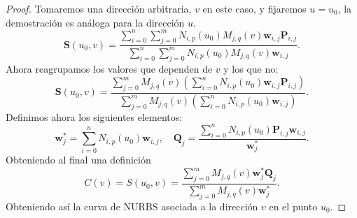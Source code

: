 \documentclass[11pt]{book}
\theoremstyle{plain} %
\theoremstyle{definition} %
\theoremstyle{definition} %
\begin{document}
\begin{proof}
    Tomaremos una dirección arbitraria, $v$ en este caso, y fijaremos $u=u_0$, la demostración es análoga para la dirección $u$.
        \begin{equation*}
            \mathbf{S}(u_0, v) = \frac{\sum_{i=0}^{n} \sum_{j=0}^{m} N_{i,p}(u_0) M_{j,q}(v) \mathbf{w}_{i,j} \mathbf{P}_{i,j}}{\sum_{i=0}^{n} \sum_{j=0}^{m} N_{i,p}(u_0) M_{j,q}(v) \mathbf{w}_{i,j}}.
        \end{equation*}
        Ahora reagrupamos los valores que dependen de $v$ y los que no:
        \begin{equation*}
            \mathbf{S}(u_0, v) = \frac{\sum_{j=0}^{m} M_{j,q}(v) \left( \sum_{i=0}^{n} N_{i,p}(u_0) \mathbf{w}_{i,j} \mathbf{P}_{i,j} \right)}{\sum_{j=0}^{m} M_{j,q}(v) \left( \sum_{i=0}^{n} N_{i,p}(u_0) \mathbf{w}_{i,j} \right)}.
        \end{equation*}
        Definimos ahora los siguientes elementos:
        \begin{equation*}
            \mathbf{w}^*_j=\sum_{i=0}^n  N_{i,p}(u_0) \mathbf{w}_{i,j}, \quad  \mathbf{Q}_j=\frac{\sum_{i=0}^n N_{i,p}(u_0) \mathbf{P}_{i,j} \mathbf{w}_{i,j}}{\mathbf{w}^*_j}.
        \end{equation*}
        Obteniendo al final una definición 
        \begin{equation*}
            C(v)=S(u_0,v)=\frac{\sum_{j=0}^{m} M_{j,q}(v) \mathbf{w}^*_{j} \mathbf{Q}_j }{\sum_{j=0}^{m} M_{j,q}(v) \mathbf{w}^*_{j} }.
        \end{equation*}
        Obteniendo así la curva de NURBS asociada a la dirección $v$ en el punto $u_0$.
\end{proof}
\end{document}
